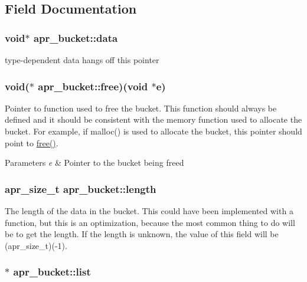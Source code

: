 \subsection{Field Documentation}
\hypertarget{structapr__bucket_a7fc4604750889b3f762bda1a786d276a}{
\subsubsection[{data}]{\setlength{\rightskip}{0pt plus 5cm}void$\ast$ apr\-\_\-bucket\-::data}}\label{structapr__bucket_a7fc4604750889b3f762bda1a786d276a}
type-\/dependent data hangs off this pointer \hypertarget{structapr__bucket_ac50b1c1de2b171938c33bf3ac478f359}{
\subsubsection[{free}]{\setlength{\rightskip}{0pt plus 5cm}void($\ast$ apr\-\_\-bucket\-::free)(void $\ast$e)}}\label{structapr__bucket_ac50b1c1de2b171938c33bf3ac478f359}
Pointer to function used to free the bucket. This function should always be defined and it should be consistent with the memory function used to allocate the bucket. For example, if malloc() is used to allocate the bucket, this pointer should point to \hyperlink{structapr__bucket_ac50b1c1de2b171938c33bf3ac478f359}{free()}. 
\begin{DoxyParams}{Parameters}
{\em e} & Pointer to the bucket being freed \\
\hline
\end{DoxyParams}
\hypertarget{structapr__bucket_a0898dfc78d9275187189b9a745e619bf}{
\subsubsection[{length}]{\setlength{\rightskip}{0pt plus 5cm}apr\-\_\-size\-\_\-t apr\-\_\-bucket\-::length}}\label{structapr__bucket_a0898dfc78d9275187189b9a745e619bf}
The length of the data in the bucket. This could have been implemented with a function, but this is an optimization, because the most common thing to do will be to get the length. If the length is unknown, the value of this field will be (apr\-\_\-size\-\_\-t)(-\/1). \hypertarget{structapr__bucket_a5a500b80105834621514d6c0814d0966}{
\subsubsection[{list}]{$\ast$ apr\-\_\-bucket\-::list}}\label{structapr__bucket_a5a500b80105834621514d6c0814d0966}
